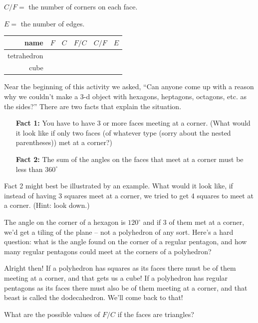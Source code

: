 $C/F =$ the number of corners on each face.

$E =$ the number of edges.
\bigskip

\begin{tabular}{r|c|c|c|c|c} 
\bigstrut name & $F$ & $C$ & $F/C$ & $C/F$ & $E$ \\ \hline
\bigstrut tetrahedron & \hstrut & \hstrut & \hstrut & \hstrut & \hstrut \\ \hline
\bigstrut cube & & & & & 
\end{tabular}

\wbnewpage

Near the beginning of this activity we asked, ``Can anyone come up with a reason why we couldn't make a 3-d object with hexagons, heptagons, octagons, etc. as the sides?''  There are two facts that explain the situation.

\begin{itemize}
    \item[{\bf Fact 1:}] You have to have 3 or more faces meeting at a corner. \newline
    (What would it look like if only two faces (of whatever type (sorry about the nested parentheses)) met at a corner?)
    \item[{\bf Fact 2:}] The sum of the angles on the faces that meet at a corner must be less than $360^\circ$ \newline
\end{itemize}

Fact 2 might best be illustrated by an example.  What would it look like, if instead of having 3 squares meet at a corner, we tried to get 4 squares to meet at a corner. (Hint: look down.)

The angle on the corner of a hexagon is $120^\circ$ and if $3$ of them met at a corner, we'd get a tiling of the plane -- not a polyhedron of any sort.  Here's a hard question: what is the angle found on the corner of a regular pentagon, and how many regular pentagons could meet at the corners of a polyhedron?

\vspace{1in}

Alright then! If a polyhedron has squares as its faces there must be \underline{\hstrut} of them meeting at a corner, and that gets us a cube!  If a polyhedron has regular pentagons as its faces there must also be \underline{\hstrut} of them meeting at a corner, and that beast is called the dodecahedron.  We'll come back to that!

What are the possible values of $F/C$ if the faces are triangles?

